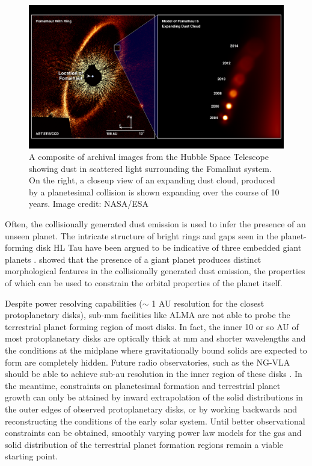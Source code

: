 \begin{figure}
\begin{center}
    \includegraphics[width=\textwidth]{figures/intro/fomalhutb.png}
    \caption{A composite of archival images from the Hubble Space Telescope showing dust in scattered light surrounding the Fomalhut system. On the right, a closeup view of an expanding dust cloud, produced by a planetesimal collision is shown expanding over the course of 10 years. Image credit: NASA/ESA\label{fig:fomalhutb}}
\end{center}
\end{figure}

Often, the collisionally generated dust emission is used to infer the presence of an unseen planet. The intricate structure of bright rings and gaps seen in the planet-forming disk HL Tau \cite{alma15} have been argued to be indicative of three embedded giant planets \cite{boley17}. \cite{dobinson13, dobinson16} showed that the presence of a giant planet produces distinct morphological features in the collisionally generated dust emission, the properties of which can be used to constrain the orbital properties of the planet itself.

Despite power resolving capabilities ($\sim$ 1 AU resolution for the closest protoplanetary disks), sub-mm facilities like ALMA are not able to probe the terrestrial planet forming region of most disks. In fact, the inner 10 or so AU of most protoplanetary disks are optically thick at mm and shorter wavelengths \cite{beckwith90} and the conditions at the midplane where gravitationally bound solids are expected to form are completely hidden. Future radio observatories, such as the NG-VLA should be able to achieve sub-au resolution in the inner region of these disks \cite{ricci20}. In the meantime, constraints on planetesimal formation and terrestrial planet growth can only be attained by inward extrapolation of the solid distributions in the outer edges of observed protoplanetary disks, or by working backwards and reconstructing the conditions of the early solar system. Until better observational constraints can be obtained, smoothly varying power law models for the gas and solid distribution of the terrestrial planet formation regions remain a viable starting point.

